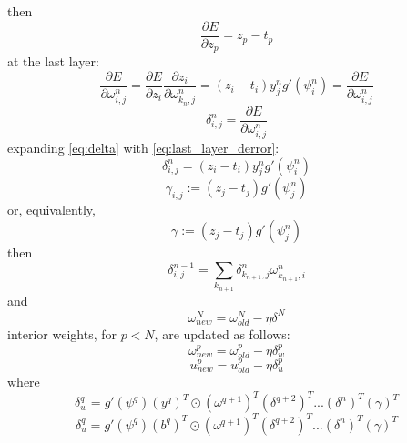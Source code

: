 \documentclass{article}
\begin{document}
%
then
%
\begin{equation} \label{eq:derror}
\frac{\partial E}{\partial z_p} = z_p - t_p
\end{equation}
%
at the last layer:
%
\begin{equation} \label{eq:last_layer_derror}
\frac{\partial E}{\partial \omega_{i,j}^n} =
\frac{\partial E}{\partial z_i} \frac{\partial z_i}{\partial \omega_{k_n, j}^n} =
\left ( z_i - t_i \right ) y_j^n g' (\psi_i^n) =
\frac{\partial E}{\partial \omega_{i,j}^n}
\end{equation}
%
\begin{equation} \label{eq:delta}
\delta_{i,j}^n = \frac{\partial E}{\partial \omega_{i,j}^n}
\end{equation}
%
expanding \ref{eq:delta} with \ref{eq:last_layer_derror}:
%
\begin{equation} \label{eq:delta_full}
\delta_{i,j}^n = 
\left ( z_i - t_i \right ) y_j^n g' (\psi_i^n)
\end{equation}
%
\begin{equation} \label{eq:gamma}
\gamma_{i,j} := (z_j - t_j) g'(\psi_j^n)
\end{equation}
%
or, equivalently,
%
\begin{equation} \label{eq:gamma_array}
\gamma := (z_j - t_j) g'(\psi_j^n)
\end{equation}
%
then
%
\begin{equation} \label{eq:delta2}
\delta_{i,j}^{n-1} =
\sum_{k_{n+1}} \delta_{k_{n+1},j}^n \omega_{k_{n+1},i}^n
\end{equation}
%
and
%
\begin{equation} \label{eq:end_weights}
\omega_{new}^N = \omega_{old}^N - \eta \delta^N
\end{equation}
%
interior weights, for $p < N$, are updated as follows:
%
\begin{equation} \label{eq:w_weights}
\omega_{new}^p = \omega_{old}^p - \eta \delta_w^p
\end{equation}
%
\begin{equation} \label{eq:u_weights}
u_{new}^p = u_{old}^p - \eta \delta_u^p
\end{equation}
%
where
%
\begin{equation} \label{eq:w_delta}
\delta_w^{q} = g'(\psi^{q}) (y^{q})^T \odot (\omega^{q+1})^T (\delta ^{q+2})^T ... (\delta^n)^T (\gamma)^T
\end{equation}
%
\begin{equation} \label{eq:u_delta}
\delta_u^{q} = g'(\psi^{q}) (b^{q})^T \odot (\omega^{q+1})^T (\delta ^{q+2})^T ... (\delta^n)^T (\gamma)^T
\end{equation}
%
\end{document}
